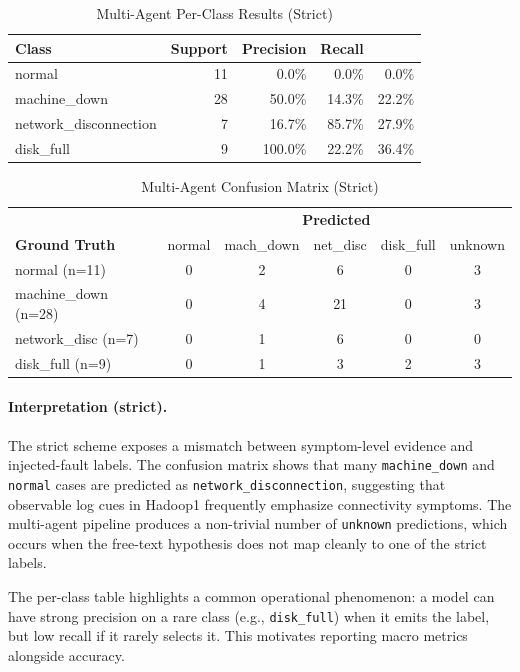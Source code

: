 \begin{table}[H]
\centering
\caption{Multi-Agent Per-Class Results (Strict)}
\label{tab:ma-strict-perclass}
\begin{tabular}{lrrrr}
\toprule
\textbf{Class} & \textbf{Support} & \textbf{Precision} & \textbf{Recall} & \textbf{\fone{}} \\
\midrule
normal                 & 11 & 0.0\%   & 0.0\%   & 0.0\%  \\
machine\_down          & 28 & 50.0\%  & 14.3\%  & 22.2\% \\
network\_disconnection & 7  & 16.7\%  & 85.7\%  & 27.9\% \\
disk\_full             & 9  & 100.0\% & 22.2\%  & 36.4\% \\
\bottomrule
\end{tabular}
\end{table}

\begin{table}[H]
\centering
\caption{Multi-Agent Confusion Matrix (Strict)}
\label{tab:ma-cm-strict}
\begin{tabular}{l|ccccc}
\toprule
& \multicolumn{5}{c}{\textbf{Predicted}} \\
\textbf{Ground Truth} & normal & mach\_down & net\_disc & disk\_full & unknown \\
\midrule
normal (n=11)       & 0 & 2 & 6 & 0 & 3 \\
machine\_down (n=28) & 0 & 4 & 21 & 0 & 3 \\
network\_disc (n=7)  & 0 & 1 & 6 & 0 & 0 \\
disk\_full (n=9)     & 0 & 1 & 3 & 2 & 3 \\
\bottomrule
\end{tabular}
\end{table}

\paragraph{Interpretation (strict).}
The strict scheme exposes a mismatch between symptom-level evidence and injected-fault labels.
The confusion matrix shows that many \texttt{machine\_down} and \texttt{normal} cases are predicted
as \texttt{network\_disconnection}, suggesting that observable log cues in Hadoop1 frequently
emphasize connectivity symptoms. The multi-agent pipeline produces a non-trivial number of
\texttt{unknown} predictions, which occurs when the free-text hypothesis does not map cleanly to
one of the strict labels.

The per-class table highlights a common operational phenomenon: a model can have strong precision
on a rare class (e.g., \texttt{disk\_full}) when it emits the label, but low recall if it rarely
selects it. This motivates reporting macro metrics alongside accuracy.

